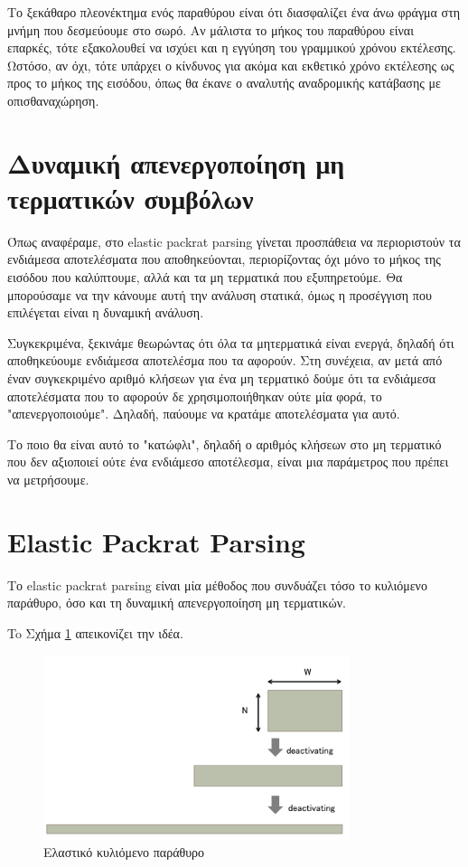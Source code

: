 Το ξεκάθαρο πλεονέκτημα ενός παραθύρου είναι ότι διασφαλίζει ένα άνω φράγμα στη μνήμη που δεσμεύουμε στο σωρό.
Αν μάλιστα το μήκος του παραθύρου είναι επαρκές, τότε εξακολουθεί να ισχύει και η εγγύηση του γραμμικού χρόνου εκτέλεσης.
Ωστόσο, αν όχι, τότε υπάρχει ο κίνδυνος για ακόμα και εκθετικό χρόνο εκτέλεσης ως προς το μήκος της εισόδου, όπως θα έκανε ο αναλυτής αναδρομικής κατάβασης με οπισθαναχώρηση.

\section{Δυναμική απενεργοποίηση μη τερματικών συμβόλων}

Όπως αναφέραμε, στο elastic packrat parsing γίνεται προσπάθεια να περιοριστούν τα ενδιάμεσα αποτελέσματα που αποθηκεύονται, περιορίζοντας όχι μόνο το μήκος της εισόδου που καλύπτουμε, αλλά και τα μη τερματικά που εξυπηρετούμε.
Θα μπορούσαμε να την κάνουμε αυτή την ανάλυση στατικά, όμως η προσέγγιση που επιλέγεται είναι η δυναμική ανάλυση.

Συγκεκριμένα, ξεκινάμε θεωρώντας ότι όλα τα μητερματικά είναι ενεργά, δηλαδή ότι αποθηκεύουμε ενδιάμεσα αποτελέσμα που τα αφορούν.
Στη συνέχεια, αν μετά από έναν συγκεκριμένο αριθμό κλήσεων για ένα μη τερματικό δούμε ότι τα ενδιάμεσα αποτελέσματα που το αφορούν δε χρησιμοποιήθηκαν ούτε μία φορά, το "απενεργοποιούμε".
Δηλαδή, παύουμε να κρατάμε αποτελέσματα για αυτό.

Το ποιο θα είναι αυτό το "κατώφλι", δηλαδή ο αριθμός κλήσεων στο μη τερματικό που δεν αξιοποιεί ούτε ένα ενδιάμεσο αποτέλεσμα, είναι μια παράμετρος που πρέπει να μετρήσουμε.

\section{Elastic Packrat Parsing}

Το elastic packrat parsing είναι μία μέθοδος που συνδυάζει τόσο το κυλιόμενο παράθυρο, όσο και τη δυναμική απενεργοποίηση μη τερματικών.

To Σχήμα \ref{fig:elastic_slide_window} απεικονίζει την ιδέα.

\begin{figure}[h]
	\centering
	\includegraphics[width=0.8\textwidth]{pics/elastic_slide_window} 
	\caption{Ελαστικό κυλιόμενο παράθυρο}
	\label{fig:elastic_slide_window}
\end{figure}

